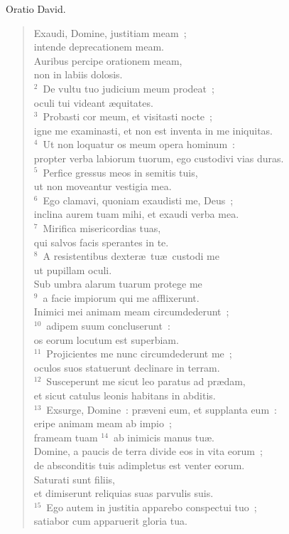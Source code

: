\bchapter
\lettrine[lines=3,image=true,loversize=0.05,lraise=-0.03]{O}{}ratio David. \begin{flushleft}\begin{verse}\vspace{6pt}Exaudi, Domine, justitiam meam~;\\ intende deprecationem meam.\\ Auribus percipe orationem meam,\\ non in labiis dolosis.\\
${}^{2}$~De vultu tuo judicium meum prodeat~;\\ oculi tui videant \ae quitates.\\
${}^{3}$~Probasti cor meum, et visitasti nocte~;\\ igne me examinasti, et non est inventa in me iniquitas.\\
${}^{4}$~Ut non loquatur os meum opera hominum~:\\ propter verba labiorum tuorum, ego custodivi vias duras.\\
${}^{5}$~Perfice gressus meos in semitis tuis,\\ ut non moveantur vestigia mea.\\
${}^{6}$~Ego clamavi, quoniam exaudisti me, Deus~;\\ inclina aurem tuam mihi, et exaudi verba mea.\\
${}^{7}$~Mirifica misericordias tuas,\\ qui salvos facis sperantes in te.\\
${}^{8}$~A resistentibus dexter\ae\ tu\ae\ custodi me\\ ut pupillam oculi.\\ Sub umbra alarum tuarum protege me\\
${}^{9}$~a facie impiorum qui me afflixerunt.\\ Inimici mei animam meam circumdederunt~;\\
${}^{10}$~adipem suum concluserunt~:\\ os eorum locutum est superbiam.\\
${}^{11}$~Projicientes me nunc circumdederunt me~;\\ oculos suos statuerunt declinare in terram.\\
${}^{12}$~Susceperunt me sicut leo paratus ad pr\ae dam,\\ et sicut catulus leonis habitans in abditis.\\
${}^{13}$~Exsurge, Domine~: pr\ae veni eum, et supplanta eum~:\\ eripe animam meam ab impio~;\\ frameam tuam
${}^{14}$~ab inimicis manus tu\ae .\\ Domine, a paucis de terra divide eos in vita eorum~;\\ de absconditis tuis adimpletus est venter eorum.\\ Saturati sunt filiis,\\ et dimiserunt reliquias suas parvulis suis.\\
${}^{15}$~Ego autem in justitia apparebo conspectui tuo~;\\ satiabor cum apparuerit gloria tua.\end{verse}\end{flushleft}
